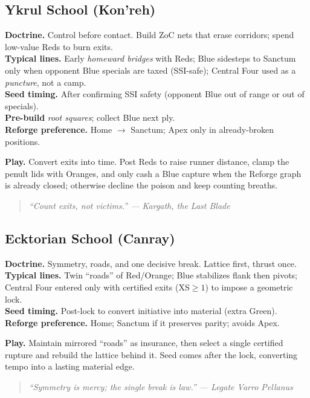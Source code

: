 \documentclass[11pt]{article}
\providecommand{\playdesc}[1]{\par\smallskip\noindent\small\textbf{Play.} #1\par}
\begin{document}
\subsection*{Ykrul School (Kon'reh)}
\textbf{Doctrine.} Control before contact. Build ZoC nets that erase corridors; spend low-value Reds to burn exits.\\
\textbf{Typical lines.} Early \emph{homeward bridges} with Reds; Blue sidesteps to Sanctum only when opponent Blue specials are taxed (SSI-safe); Central Four used as a \emph{puncture}, not a camp.\\
\textbf{Seed timing.} After confirming SSI safety (opponent Blue out of range or out of specials).\\
\textbf{Pre-build} \emph{root squares}; collect Blue next ply. \\
\textbf{Reforge preference.} Home $\rightarrow$ Sanctum; Apex only in already-broken positions.
\playdesc{Convert exits into time. Post Reds to raise runner distance, clamp the penult lids with Oranges, and only cash a Blue capture when the Reforge graph is already closed; otherwise decline the poison and keep counting breaths.}
\medskip
\begin{quote}\small\itshape
``Count exits, not victims.'' --- Kargath, the Last Blade
\end{quote}

\subsection*{Ecktorian School (Canray)}
\textbf{Doctrine.} Symmetry, roads, and one decisive break. Lattice first, thrust once.\\
\textbf{Typical lines.} Twin ``roads'' of Red/Orange; Blue stabilizes flank then pivots; Central Four entered only with certified exits (XS$\ge1$) to impose a geometric lock.\\
\textbf{Seed timing.} Post-lock to convert initiative into material (extra Green).\\
\textbf{Reforge preference.} Home; Sanctum if it preserves parity; avoids Apex.
\playdesc{Maintain mirrored ``roads'' as insurance, then select a single certified rupture and rebuild the lattice behind it. Seed comes after the lock, converting tempo into a lasting material edge.}
\begin{quote}\small\itshape
``Symmetry is mercy; the single break is law.'' --- Legate Varro Pellanus
\end{quote}
\end{document}
